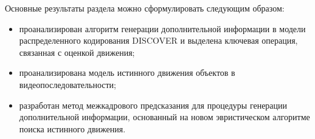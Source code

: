 Основные результаты раздела можно сформулировать следующим образом:
\begin{itemize}
\item проанализирован алгоритм генерации дополнительной информации в модели распределенного кодирования DISCOVER и выделена ключевая операция, связанная с оценкой движения;
\item проанализирована модель истинного движения объектов в видеопоследовательности;
\item разработан метод межкадрового предсказания для процедуры генерации дополнительной информации, основанный на новом эвристическом алгоритме поиска истинного движения.
\end{itemize}